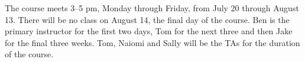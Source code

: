The course meets 3--5 pm, Monday through Friday, from July 20 through
August 13. There will be no class on August 14, the final day of the course.
Ben is the primary instructor for the first two days, Tom for the next three and then Jake for the final three weeks. Tom, Naiomi and Sally will be the TAs for the duration of the course.


